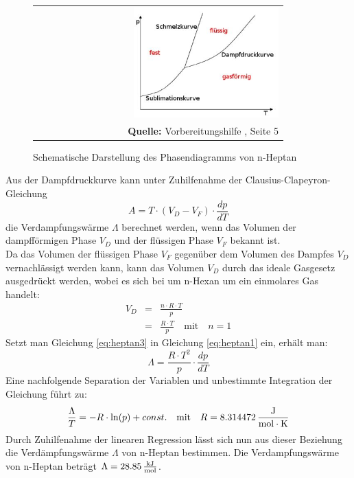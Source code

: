 \documentclass[a4paper,titlepage]{scrartcl}
\numberwithin{equation}{section}
\begin{document}
\begin{figure}[H]
	\centering
	\begin{tabular}{@{}r@{}}
		\includegraphics[width=0.6\textwidth]{bilder/phasendiagramm.JPG}\\
		\footnotesize\sffamily\textbf{Quelle:} Vorbereitungshilfe \cite{vorbereitungshilfe}, Seite 5
	\end{tabular}
	\caption{Schematische Darstellung des Phasendiagramms von n-Heptan}
	\label{fig:phasendiagramm}
\end{figure}
Aus der Dampfdruckkurve kann unter Zuhilfenahme der Clausius-Clapeyron-Gleichung
\begin{equation}
\label{eq:heptan1}
A=T \cdot (V_D-V_F) \cdot \frac{dp}{dT}
\end{equation}
die Verdampfungswärme $\Lambda$ berechnet werden, wenn das Volumen der dampfförmigen Phase $V_D$ und der flüssigen Phase $V_F$ bekannt ist.\\
Da das Volumen der flüssigen Phase $V_F$ gegenüber dem Volumen des Dampfes $V_D$ vernachlässigt werden kann, kann das Volumen $V_D$ durch das ideale Gasgesetz ausgedrückt werden, wobei es sich bei um n-Hexan um ein einmolares Gas handelt:
\begin{eqnarray}
V_D&=&\frac{n \cdot R \cdot T}{p}\label{eq:heptan2}\\
&=&\frac{R \cdot T}{p} \quad \text{mit} \quad n = 1 \label{eq:heptan3}
\end{eqnarray}
Setzt man Gleichung \ref{eq:heptan3} in Gleichung \ref{eq:heptan1} ein, erhält man:
\begin{equation*}
\Lambda = \frac{R \cdot T^2}{p} \cdot \frac{dp}{dT}
\end{equation*}
Eine nachfolgende Separation der Variablen und unbestimmte Integration der Gleichung führt zu:
\begin{equation*}
\frac{\Lambda}{T}=-R \cdot \ln(p) + const. \quad \text{mit} \quad R=\unit[8.314472]{\frac{J}{mol \cdot K}}
\end{equation*}
Durch Zuhilfenahme der linearen Regression lässt sich nun aus dieser Beziehung die Verdämpfungswärme $\Lambda$ von n-Heptan bestimmen.
Die Verdampfungswärme von n-Heptan beträgt $\Lambda = \unit[28.85]{\frac{kJ}{mol}}$.
\newpage


\end{document}
